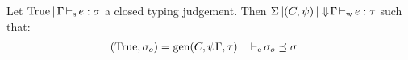 
\begin{theorem}[Principality]
  Let $\inferS{\Ctrue}{\E}{e}{\schm}$ a closed typing judgement.
  Then $\inferW{\Sv}{(C,\unif)}{\Eflat\E}{e}{\tau}$
  such that:
  \begin{align*}
    (\Ctrue,\schm_o) &= \generalize{C}{\unif\E}{\tau}
    &\entail{&}{\schm_o \preceq \schm}
  \end{align*}


\end{theorem}

